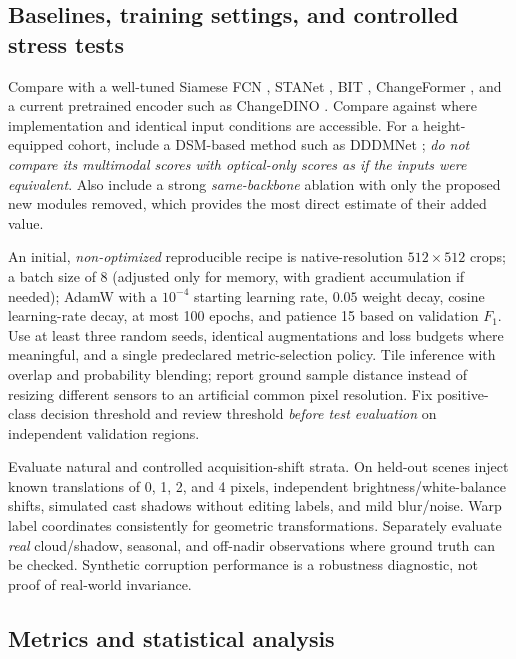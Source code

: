 \documentclass[11pt,a4paper]{article}
\begin{document}
\subsection{Baselines, training settings, and controlled stress tests}

Compare with a well-tuned Siamese FCN \citep{Daudt2018}, STANet \citep{ChenShi2020}, BIT \citep{ChenBIT2022}, ChangeFormer \citep{Bandara2022}, and a current pretrained encoder such as ChangeDINO \citep{ChengHsu2026}. Compare against \citet{Lu2026} where implementation and identical input conditions are accessible. For a height-equipped cohort, include a DSM-based method such as DDDMNet \citep{Fu2025}; \emph{do not compare its multimodal scores with optical-only scores as if the inputs were equivalent}. Also include a strong \emph{same-backbone} ablation with only the proposed new modules removed, which provides the most direct estimate of their added value.

An initial, \emph{non-optimized} reproducible recipe is native-resolution $512\times512$ crops; a batch size of 8 (adjusted only for memory, with gradient accumulation if needed); AdamW with a $10^{-4}$ starting learning rate, $0.05$ weight decay, cosine learning-rate decay, at most 100 epochs, and patience 15 based on validation $F_1$. Use at least three random seeds, identical augmentations and loss budgets where meaningful, and a single predeclared metric-selection policy. Tile inference with overlap and probability blending; report ground sample distance instead of resizing different sensors to an artificial common pixel resolution. Fix positive-class decision threshold and review threshold \emph{before test evaluation} on independent validation regions.

Evaluate natural and controlled acquisition-shift strata. On held-out scenes inject known translations of 0, 1, 2, and 4 pixels, independent brightness/white-balance shifts, simulated cast shadows without editing labels, and mild blur/noise. Warp label coordinates consistently for geometric transformations. Separately evaluate \emph{real} cloud/shadow, seasonal, and off-nadir observations where ground truth can be checked. Synthetic corruption performance is a robustness diagnostic, not proof of real-world invariance.

\subsection{Metrics and statistical analysis}
\end{document}

